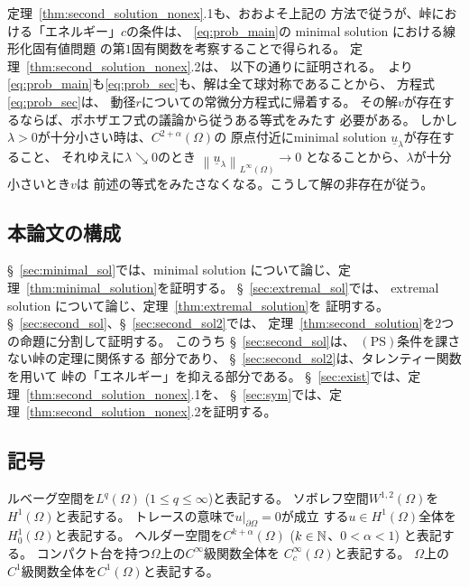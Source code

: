 定理~\ref{thm:second_solution_nonex}.1も、おおよそ上記の
方法で従うが、峠における「エネルギー」$c$の条件は、
\ref{eq:prob_main}の minimal solution における線形化固有値問題
の第$1$固有関数を考察することで得られる。
定理~\ref{thm:second_solution_nonex}.2は、
以下の通りに証明される。\cite{MR544879}~より
\ref{eq:prob_main}も\ref{eq:prob_sec}も、解は全て球対称であることから、
方程式\ref{eq:prob_sec}は、
動径$r$についての常微分方程式に帰着する。
その解$v$が存在するならば、ポホザエフ式の議論から従うある等式をみたす
必要がある。
しかし$\lambda > 0$が十分小さい時は、$C^{2 + \alpha}(\Omega)$の
原点付近にminimal solution $\underline{u}_\lambda$が存在すること、
それゆえに$\lambda \searrow 0$のとき
$\left\| \underline{u}_\lambda \right\|_{L^\infty(\Omega)} \to 0$
となることから、$\lambda$が十分小さいとき$v$は
前述の等式をみたさなくなる。こうして解の非存在が従う。

\subsection{本論文の構成}

\S~\ref{sec:minimal_sol}では、minimal solution について論じ、定
理~\ref{thm:minimal_solution}を証明する。
\S~\ref{sec:extremal_sol}では、
extremal solution について論じ、定理~\ref{thm:extremal_solution}を
証明する。
\S~\ref{sec:second_sol}、\S~\ref{sec:second_sol2}では、
定理~\ref{thm:second_solution}を$2$つの命題に分割して証明する。
このうち
\S~\ref{sec:second_sol}は、
$(\mathrm{PS})$条件を課さない峠の定理に関係する
部分であり、
\S~\ref{sec:second_sol2}は、タレンティー関数を用いて
峠の「エネルギー」を抑える部分である。
\S~\ref{sec:exist}では、定理~\ref{thm:second_solution_nonex}.1を、
\S~\ref{sec:sym}では、定理~\ref{thm:second_solution_nonex}.2を証明する。

\subsection{記号}

ルベーグ空間を$L^q(\Omega)$ ($1 \leq q \leq \infty$)と表記する。
ソボレフ空間$W^{1, 2}(\Omega)$を$H^1(\Omega)$と表記する。
トレースの意味で$u |_{\partial \Omega} = 0$が成立
する$u \in H^1(\Omega)$全体を$H_0^1(\Omega)$と表記する。
ヘルダー空間を$C^{k + \alpha}(\Omega)$ ($k \in \mathbb{N}$、$0 < \alpha < 1$)
と表記する。
コンパクト台を持つ$\Omega$上の$C^\infty$級関数全体を
$C^\infty_c (\Omega)$と表記する。
$\Omega$上の$C^1$級関数全体を$C^1(\Omega)$と表記する。

